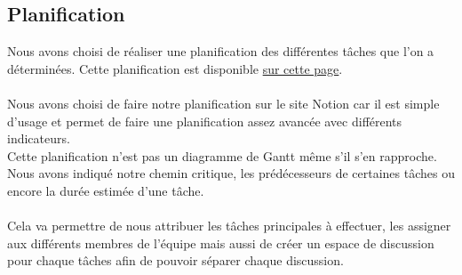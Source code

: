 \documentclass{tnreport}
\begin{document}
\subsection*{Planification}
\begin{sloppypar}
    Nous avons choisi de réaliser une planification des différentes tâches que l'on a déterminées. Cette planification est disponible \href{https://humane-wasp-582.notion.site/5f64fa977cbc4b168b634499d80aa1f3?v=48621b47058942d49c3964062fba6310}{sur cette page}. \\
    \\
    Nous avons choisi de faire notre planification sur le site Notion car il est simple d'usage et permet de faire une planification assez avancée avec différents indicateurs.
    \\
    Cette planification n'est pas un diagramme de Gantt même s'il s'en rapproche. Nous avons indiqué notre chemin critique, les prédécesseurs de certaines tâches ou encore la durée estimée d'une tâche.\\
    \\
    Cela va permettre de nous attribuer les tâches principales à effectuer, les assigner aux différents membres de l'équipe mais aussi de créer un espace de discussion pour chaque tâches afin de pouvoir séparer chaque discussion.
\end{sloppypar}
\end{document}
